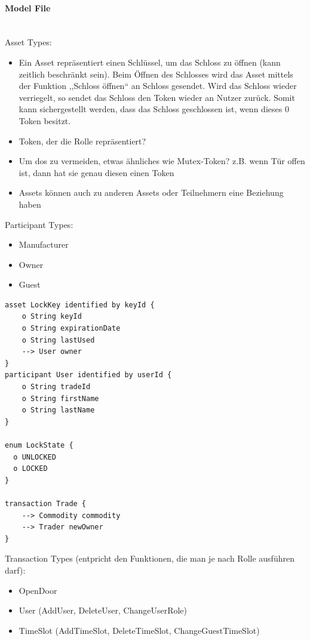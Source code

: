         \paragraph{\textrm{Model File}}\hspace{0cm}\smallskip\\
            Asset Types:
            \begin{itemize}[noitemsep]
                \item Ein Asset repräsentiert einen Schlüssel, um das Schloss zu öffnen (kann zeitlich beschränkt sein). 
                    Beim Öffnen des Schlosses wird das Asset mittels der Funktion ,,Schloss öffnen`` an Schloss gesendet.
                    Wird das Schloss wieder verriegelt, so sendet das Schloss den Token wieder an Nutzer zurück.
                    Somit kann sichergestellt werden, dass das Schloss geschlossen ist, wenn dieses 0 Token besitzt.
                \item Token, der die Rolle repräsentiert?
                \item Um \gls{dos} zu vermeiden, etwas ähnliches wie Mutex-Token? z.B. wenn Tür offen ist, dann hat sie genau diesen einen Token
                \item Assets können auch zu anderen Assets oder Teilnehmern eine Beziehung haben\cite{ComposerDocs}
            \end{itemize}
            
            Participant Types:
            \begin{itemize}[noitemsep]
                \item Manufacturer
                \item Owner
                \item Guest
            \end{itemize}
            \begin{lstlisting}[caption={Participant Types (TODO)},label=participants,captionpos=b]
asset LockKey identified by keyId {
    o String keyId
    o String expirationDate
    o String lastUsed
    --> User owner
}
participant User identified by userId {
    o String tradeId
    o String firstName
    o String lastName
}

enum LockState {
  o UNLOCKED
  o LOCKED
}

transaction Trade {
    --> Commodity commodity
    --> Trader newOwner
}
            \end{lstlisting}
        
            Transaction Types (entpricht den Funktionen, die man je nach Rolle ausführen darf):
            \begin{itemize}[noitemsep]
                \item OpenDoor
                \item User (AddUser, DeleteUser, ChangeUserRole)
                \item TimeSlot (AddTimeSlot, DeleteTimeSlot, ChangeGuestTimeSlot)
            \end{itemize}
    
